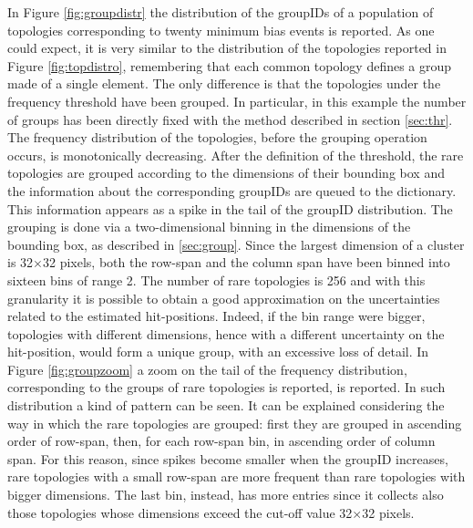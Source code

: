 In Figure \ref{fig:groupdistr} the distribution of the groupIDs of a population of topologies corresponding to twenty minimum bias events is reported. As one could expect, it is very similar to the distribution of the topologies reported in Figure \ref{fig:topdistro}, remembering that each common topology defines a group made of a single element. The only difference is that the topologies under the frequency threshold have been grouped. In particular, in this example the number of groups has been directly fixed with the method described in section \ref{sec:thr}. The frequency distribution of the topologies, before the grouping operation occurs, is monotonically decreasing. After the definition of the threshold, the rare topologies are grouped according to the dimensions of their bounding box and the information about the corresponding groupIDs are queued to the dictionary. This information appears as a spike in the tail of the groupID distribution. The grouping is done via a two-dimensional binning in the dimensions of the bounding box, as described in \ref{sec:group}. Since the largest dimension of a cluster is 32$\times$32 pixels, both the row-span and the column span have been binned into sixteen bins of range 2. The number of rare topologies is 256 and with this granularity it is possible to obtain a good approximation on the uncertainties related to the estimated hit-positions. Indeed, if the bin range were bigger, topologies with different dimensions, hence with a different uncertainty on the hit-position, would form a unique group, with an excessive loss of detail. In Figure \ref{fig:groupzoom} a zoom on the tail of the frequency distribution, corresponding to the groups of rare topologies is reported, is reported. In such distribution a kind of pattern can be seen. It can be explained considering the way in which the rare topologies are grouped: first they are grouped in ascending order of row-span, then, for each row-span bin, in ascending order of column span. For this reason, since spikes become smaller when the groupID increases, rare topologies with a small row-span are more frequent than rare topologies with bigger dimensions. The last bin, instead, has more entries since it collects also those topologies whose dimensions exceed the cut-off value 32$\times$32 pixels.
